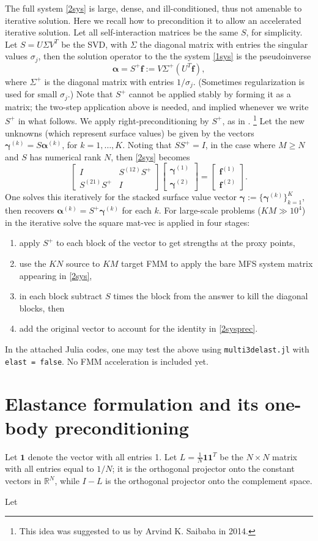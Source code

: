 \documentclass[10pt]{article}
\newcommand{\ben}{\begin{enumerate}}
\newcommand{\een}{\end{enumerate}}
\newcommand{\be}{\begin{equation}}
\newcommand{\ee}{\end{equation}}
\newcommand{\mbf}[1]{{\mathbf #1}}
\newcommand{\R}{\mathbb{R}}
\newcommand{\vt}[2]{\left[\begin{array}{r}#1\\#2\end{array}\right]} %
\newcommand{\mt}[4]{\left[\begin{array}{rr}#1&#2\\#3&#4\end{array}\right]} %
\newcommand{\f}{\mathbf{f}}
\newcommand{\bal}{\bm{\alpha}}
\newcommand{\bga}{\bm{\gamma}}
\newcommand{\ok}{^{(k)}}
\begin{document}
The full system \eqref{2sys} is large, dense, and ill-conditioned,
thus not amenable to iterative solution.
Here we recall how to precondition it to allow an accelerated iterative
solution.
Let all self-interaction matrices be the same $S$, for simplicity.
Let $S = U \Sigma V^T$ be the SVD,
with $\Sigma$ the diagonal matrix with entries the singular values $\sigma_j$,
then
the solution operator to the the system \eqref{1sys}
is the pseudoinverse
$$
\bal = S^+ \f := V \Sigma^+ (U^T \f),
$$
where $\Sigma^+$ is the diagonal matrix with entries $1/\sigma_j$.
(Sometimes regularization is used for small $\sigma_j$.)
Note that $S^+$ cannot be applied stably by forming it as a matrix;
the two-step application above is needed, and implied whenever we
write $S^+$ in what follows.
We apply right-preconditioning by $S^+$, as in \cite{acper}.
\footnote{This idea was suggested to us by Arvind K. Saibaba in 2014.}
Let the new unknowns (which represent surface values)
be given by the vectors $\bga\ok = S \bal\ok$,
for $k=1,\dots,K$.
Noting that $S S^+ = I$, in the case where $M\ge N$ and $S$ has
numerical rank $N$, then
\eqref{2sys} becomes
\be
\mt{I}{S^{(12)}S^+}{S^{(21)}S^+}{I} \vt{\bga^{(1)}}{\bga^{(2)}} = \vt{\f^{(1)}}{\f^{(2)}}.
\label{2sysprec}
\ee
One solves this iteratively for the stacked surface value vector
$\bga := \{\bga\ok\}_{k=1}^K$,
then recovers $\bal\ok = S^+ \bga\ok$ for each $k$.
For large-scale problems ($KM \gg 10^4$) in the iterative solve the
square mat-vec is applied in four stages:
\ben
\item apply $S^+$ to each block of the vector to get strengths at the proxy points,
\item use the $KN$ source to $KM$ target FMM to apply the bare
MFS system matrix appearing in \eqref{2sys},
\item in each block subtract $S$ times the block from the answer
  to kill the diagonal blocks, then
\item
  add the original vector to
account for the identity in \eqref{2sysprec}.
\een

In the attached Julia codes, one may test the above using
{\tt multi3delast.jl} with {\tt elast = false}.
No FMM acceleration is included yet.


\section{Elastance formulation and its one-body preconditioning}

Let $\mbf{1}$ denote the vector with all entries 1.
Let $L = \frac{1}{N}\mbf{1}\mbf{1}^T$ be the $N\times N$ matrix
with all entries equal to $1/N$; it is the orthogonal projector
onto the constant vectors in $\R^N$,
while $I-L$ is the orthogonal projector onto the complement space.

Let 





\end{document}
